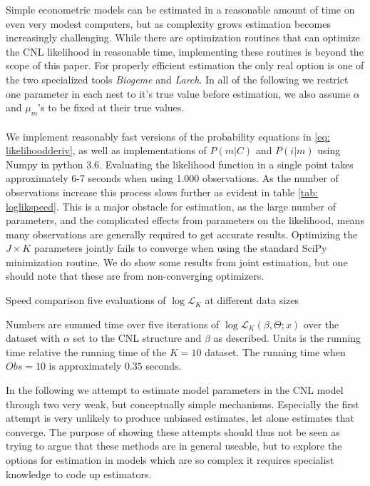 \label{sec: Code}

Simple econometric models can be estimated in a reasonable amount of time on even very modest computers, but as complexity grows estimation becomes increasingly challenging. While there are optimization routines that can optimize the CNL likelihood in reasonable time, implementing these routines is beyond the scope of this paper. For properly efficient estimation the only real option is one of the two specialized tools \textit{Biogeme} and \textit{Larch}. In all of the following we restrict one parameter in each nest to it's true value before estimation, we also assume $\alpha$ and $\mu_m$'s to be fixed at their true values.
\\ \\
We implement reasonably fast versions of the probability equations in \ref{eq: likelihoodderiv}, as well as implementations of $P(m|C)$ and $P(i|m)$ using Numpy in python 3.6. Evaluating the likelihood function in a single point takes approximately 6-7 seconds when using 1.000 observations. As the number of observations increase this process slows further as evident in table \ref{tab: loglikspeed}. This is a major obstacle for estimation, as the large number of parameters, and the complicated effects from parameters on the likelihood, means many observations are generally required to get accurate results.  Optimizing the $J\times K$ parameters jointly fails to converge when using the standard SciPy minimization routine. We do show some results from joint estimation, but one should note that these are from non-converging optimizers.

\begin{center}
\begin{threeparttable}
  \centering
  \caption{Speed comparison five evaluations of $\log\mathcal{L}_K$ at different data sizes}
  \label{tab: loglikspeed}
  
  \begin{tablenotes}\footnotesize
     \item Numbers are summed time over five iterations of $\log\mathcal{L}_K(\beta, \Theta; x)$ over the dataset with $\alpha$ set to the CNL structure and $\beta$ as described. Units is the running time relative the running time of the $K=10$ dataset. The running time when $Obs=10$ is approximately $0.35$ seconds.
  \end{tablenotes}
\end{threeparttable}
\end{center}

In the following we attempt to estimate model parameters in the CNL model through two very weak, but conceptually simple mechanisms. Especially the first attempt is very unlikely to produce unbiased estimates, let alone estimates that converge. The purpose of showing these attempts should thus not be seen as trying to argue that these methods are in general useable, but to explore the options for estimation in models which are so complex it requires specialist knowledge to code up estimators.

